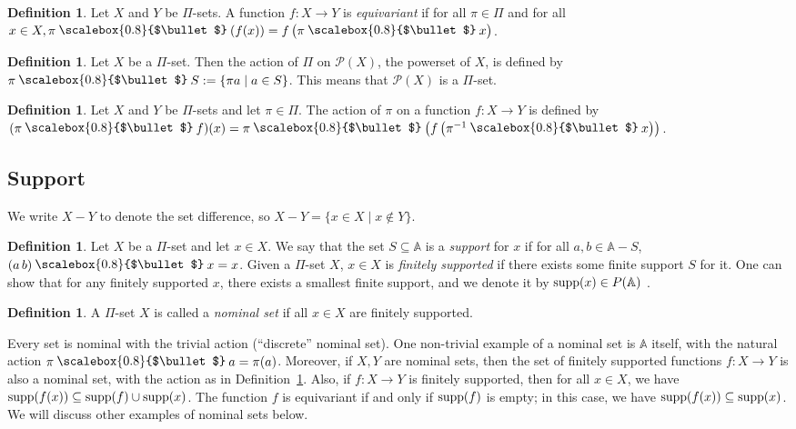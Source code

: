 \documentclass[11pt,a4paper]{amsart}
\theoremstyle{plain}
\theoremstyle{definition}
\newtheorem{xdefinition}[xtheorem]{Definition}
\theoremstyle{remark}
\newcommand{\PI}{\Pi}
\newcommand{\aA}{\mathbb{A}}
\newcommand{\supp}{\mathop{\text{\rm supp}}}
\newcommand{\set}[1]{\{#1\}}
\renewcommand{\setminus}{-}
\let\oldbullet\bullet
\newcommand{\action}{\mathbin{\text{\raisebox{0.15ex}{\scalebox{0.8}{$\oldbullet$}}}}}
\newcommand{\bul}{\action}
\newcommand{\inv}{^{-1}}
\newcommand{\powerset}{\mathcal{P}}
\begin{document}
\begin{xdefinition}
Let $X$ and $Y$ be $\PI$-sets. A function $f:X\to Y$ is \emph{equivariant} if for all  $\pi\in \Pi$ and for all $x\in X, \pi\bul \left( f(x) \right)=f\left( \pi\bul x \right)$.
\end{xdefinition}

\begin{xdefinition}
  Let $X$ be a $\PI$-set. Then the action of $\PI$ on $\powerset(X)$,
  the powerset of $X$, is defined by $\pi \bul S := \set{ \pi a
    \mid a\in S }$. This means that $\powerset(X)$ is a $\PI$-set.
\end{xdefinition}

\begin{xdefinition}\label{def:function-pi-action}
Let $X$ and $Y$ be $\PI$-sets and let $\pi \in \PI$. The action of
$\pi$ on a function $f:X\to Y$ is defined by $(\pi \bul f)(x) = \pi
\bul \left(f \left( \pi\inv \bul x\right) \right)$.
\end{xdefinition}


\subsection{Support}

We write $X\setminus Y$ to denote the set difference, so $X\setminus
Y=\set{x\in X\mid x\not\in Y}$.

\begin{xdefinition}
  Let $X$ be a $\PI$-set and let $x\in X$. We say that the set
  $S\subseteq \aA$ is a \emph{support} for $x$ if for all $a,b\in
  \aA\setminus S$, $(a\,b) \bul x=x$. Given a $\PI$-set $X$,
  $x\in X$ is \emph{finitely supported} if there exists some finite
  support $S$ for it. One can show that for any finitely supported
  $x$, there exists a smallest finite support, and we denote it by
  $\supp(x)\in P(\aA)$ \cite{Pitts2013}.
\end{xdefinition}

\begin{xdefinition}
  A $\PI$-set $X$ is called a \emph{nominal set} if all $x\in X$ are
  finitely supported.
\end{xdefinition}

\noindent Every set is nominal with the trivial action (``discrete''
nominal set). One non-trivial example of a nominal set is $\aA$
itself, with the natural action $\pi\bul a=\pi(a)$. Moreover, if $X,Y$
are nominal sets, then the set of finitely supported functions
$f : X \to Y$ is also a nominal set, with the action as in
Definition~\ref{def:function-pi-action}. Also, if $f:X\to Y$ is
finitely supported, then for all $x\in X$, we have
$\supp(f(x)) \subseteq \supp(f) \cup \supp(x)$. The function $f$ is
equivariant if and only if $\supp(f)$ is empty; in this case, we have
$\supp(f(x)) \subseteq \supp(x)$. We will discuss other examples of
nominal sets below.
\end{document}
